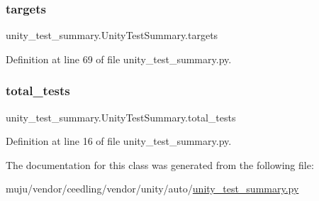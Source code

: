 \subsubsection{\texorpdfstring{targets}{targets}}
{\footnotesize\ttfamily unity\+\_\+test\+\_\+summary.\+Unity\+Test\+Summary.\+targets}



Definition at line 69 of file unity\+\_\+test\+\_\+summary.\+py.

\mbox{\label{classunity__test__summary_1_1_unity_test_summary_abd63a450624526e498bdc1499078f124}} 
\subsubsection{\texorpdfstring{total\+\_\+tests}{total\_tests}}
{\footnotesize\ttfamily unity\+\_\+test\+\_\+summary.\+Unity\+Test\+Summary.\+total\+\_\+tests}



Definition at line 16 of file unity\+\_\+test\+\_\+summary.\+py.



The documentation for this class was generated from the following file\+:\begin{DoxyCompactItemize}
\item 
muju/vendor/ceedling/vendor/unity/auto/\hyperlink{unity__test__summary_8py}{unity\+\_\+test\+\_\+summary.\+py}\end{DoxyCompactItemize}
